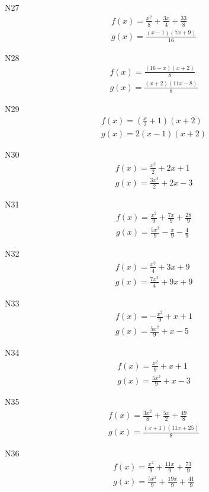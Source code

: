 \documentclass[11pt]{report}
\begin{document}
N27
\begin{align*}
 f(x) = \frac{x^{2}}{8} + \frac{3 x}{4} + \frac{33}{8}\\
 g(x) = \frac{\left(x - 1\right) \left(7 x + 9\right)}{16}
\end{align*}

N28
\begin{align*}
 f(x) = \frac{\left(16 - x\right) \left(x + 2\right)}{8}\\
 g(x) = \frac{\left(x + 2\right) \left(11 x - 8\right)}{8}
\end{align*}

N29
\begin{align*}
 f(x) = \left(\frac{x}{2} + 1\right) \left(x + 2\right)\\
 g(x) = 2 \left(x - 1\right) \left(x + 2\right)
\end{align*}

N30
\begin{align*}
 f(x) = \frac{x^{2}}{2} + 2 x + 1\\
 g(x) = \frac{3 x^{2}}{2} + 2 x - 3
\end{align*}

N31
\begin{align*}
 f(x) = \frac{x^{2}}{9} + \frac{7 x}{9} + \frac{28}{9}\\
 g(x) = \frac{5 x^{2}}{9} - \frac{x}{9} - \frac{4}{9}
\end{align*}

N32
\begin{align*}
 f(x) = \frac{x^{2}}{4} + 3 x + 9\\
 g(x) = \frac{7 x^{2}}{4} + 9 x + 9
\end{align*}

N33
\begin{align*}
 f(x) = - \frac{x^{2}}{9} + x + 1\\
 g(x) = \frac{5 x^{2}}{9} + x - 5
\end{align*}

N34
\begin{align*}
 f(x) = \frac{x^{2}}{9} + x + 1\\
 g(x) = \frac{5 x^{2}}{9} + x - 3
\end{align*}

N35
\begin{align*}
 f(x) = \frac{3 x^{2}}{8} + \frac{5 x}{2} + \frac{49}{8}\\
 g(x) = \frac{\left(x + 1\right) \left(11 x + 25\right)}{8}
\end{align*}

N36
\begin{align*}
 f(x) = \frac{x^{2}}{9} + \frac{11 x}{9} + \frac{73}{9}\\
 g(x) = \frac{5 x^{2}}{9} + \frac{19 x}{9} + \frac{41}{9}
\end{align*}
\end{document}
